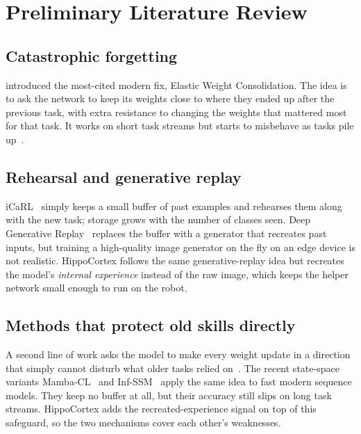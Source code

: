 \documentclass[11pt,a4paper]{article}
\begin{document}
\section{Preliminary Literature Review}

\subsection{Catastrophic forgetting}
\citet{kirkpatrick2017overcoming} introduced the most-cited modern fix, Elastic Weight Consolidation. The idea is to ask the network to keep its weights close to where they ended up after the previous task, with extra resistance to changing the weights that mattered most for that task. It works on short task streams but starts to misbehave as tasks pile up~\citep{delange2022continual}.

\subsection{Rehearsal and generative replay}
iCaRL~\citep{rebuffi2017icarl} simply keeps a small buffer of past examples and rehearses them along with the new task; storage grows with the number of classes seen. Deep Generative Replay~\citep{shin2017continual} replaces the buffer with a generator that recreates past inputs, but training a high-quality image generator on the fly on an edge device is not realistic. HippoCortex follows the same generative-replay idea but recreates the model's \emph{internal experience} instead of the raw image, which keeps the helper network small enough to run on the robot.

\subsection{Methods that protect old skills directly}
A second line of work asks the model to make every weight update in a direction that simply cannot disturb what older tasks relied on~\citep{saha2021gradient}. The recent state-space variants Mamba-CL~\citep{cheng2024mambacl} and Inf-SSM~\citep{lee2025exemplarfree} apply the same idea to fast modern sequence models. They keep no buffer at all, but their accuracy still slips on long task streams. HippoCortex adds the recreated-experience signal on top of this safeguard, so the two mechanisms cover each other's weaknesses.
\end{document}

